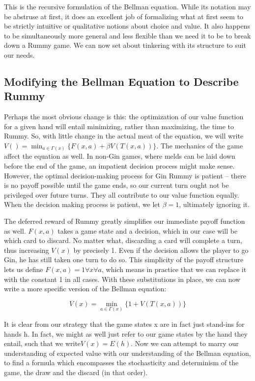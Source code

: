 \documentclass[letter,12pt]{article}
\begin{document}
This is the recursive formulation of the Bellman equation. While its notation may be abstruse at first, it does an excellent job of formalizing what at first seem to be strictly intuitive or qualitative notions about choice and value. It also happens to be simultaneously more general and less flexible than we need it to be to break down a Rummy game. We can now set about tinkering with its structure to suit our needs. 

\subsection{Modifying the Bellman Equation to Describe Rummy}

Perhaps the most obvious change is this: the optimization of our value function for a given hand will entail minimizing, rather than maximizing, the time to Rummy. So, with little change in the actual meat of the equation, we will write $V() = \min_{a \in \Gamma(x)}\{F(x,a)+\beta V(T(x,a))\}$. The mechanics of the game affect the equation as well. In non-Gin games, where melds can be laid down before the end of the game, an impatient decision process might make sense. However, the optimal decision-making process for Gin Rummy is patient – there is no payoff possible until the game ends, so our current turn ought not be privileged over future turns. They all contribute to our value function equally. When the decision making process is patient, we let $\beta= 1$, ultimately ignoring it. 
 
The deferred reward of Rummy greatly simplifies our immediate payoff function as well. $F(x,a)$ takes a game state and a decision, which in our case will be which card to discard. No matter what, discarding a card will complete a turn, thus increasing $V(x)$ by precisely 1. Even if the decision allows the player to go Gin, he has still taken one turn to do so. This simplicity of the payoff structure lets us define $F(x,a) = 1 \forall x \forall a$, which means in practice that we can replace it with the constant 1 in all cases. With these substitutions in place, we can now write a more specific version of the Bellman equation:

$$V(x) = \min_{a \in \Gamma (x)} \{1+V(T(x,a))\}$$

It is clear from our strategy that the game states x are in fact just stand-ins for hands h. In fact, we might as well just refer to our game states by the hand they entail, such that we write$V(x) = E(h)$. Now we can attempt to marry our understanding of expected value with our understanding of the Bellman equation, to find a formula which encompasses the stochasticity and determinism of the game, the draw and the discard (in that order). 
\end{document}
